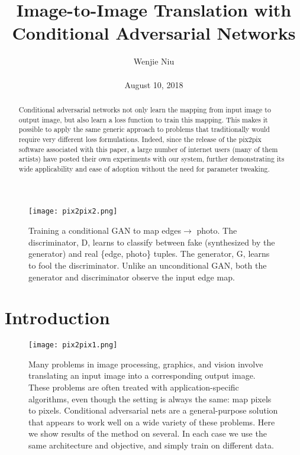 \documentclass[10pt,twocolumn,letterpaper]{article}
\begin{document}
\title{Image-to-Image Translation with Conditional Adversarial Networks}

\author{Wenjie Niu\\\\ August 10, 2018}

\maketitle

  \begin{figure}[!hbp]
  	\begin{center}
  		\texttt{[image: pix2pix2.png]}
  	\end{center}
  	\caption{Training a conditional GAN to map edges$\rightarrow$ photo. The
  		discriminator, D, learns to classify between fake (synthesized by
  		the generator) and real \{edge, photo\} tuples. The generator, G,
  		learns to fool the discriminator. Unlike an unconditional GAN,
  		both the generator and discriminator observe the input edge map.~\cite{Isola2017Image}}
  	\label{fig:pix2pix2}
  \end{figure}

\begin{abstract}
	Conditional adversarial networks not only learn the mapping from input image to output image, but also learn a loss function to train this mapping. This makes it possible to apply the same generic approach to problems that traditionally would require very different loss formulations. Indeed, since the release of the pix2pix software associated with this paper, a large number of internet users (many of them artists)
	have posted their own experiments with our system, further demonstrating its wide applicability and ease of adoption without the need for parameter tweaking.
\end{abstract}

\section{Introduction}

 \begin{figure*}
 	\begin{center}
 		\texttt{[image: pix2pix1.png]}
 	\end{center}
 	\caption{Many problems in image processing, graphics, and vision involve translating an input image into a corresponding output image. These problems are often treated with application-specific algorithms, even though the setting is always the same: map pixels to pixels. Conditional adversarial nets are a general-purpose solution that appears to work well on a wide variety of these problems. Here we show results of the method on several. In each case we use the same architecture and objective, and simply train on different data.~\cite{Isola2017Image}}
 	\label{fig:pix2pix1}
 \end{figure*}
 
\end{document}
